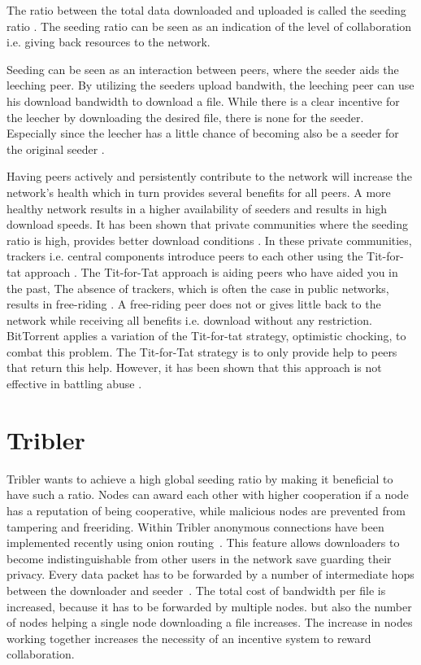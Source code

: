 The ratio between the total data downloaded and uploaded is called the seeding ratio \cite{Cohen-bittorrent}.
The seeding ratio can be seen as an indication of the level of collaboration i.e. giving back resources to the network.

Seeding can be seen as an interaction between peers, where the seeder aids the leeching peer.
By utilizing the seeders upload bandwith, the leeching peer can use his download bandwidth to download a file.
While there is a clear incentive for the leecher by downloading the desired file, there is none for the seeder.
Especially since the leecher has a little chance of becoming also be a seeder for the original seeder \cite{Lai-Incentives}.

Having peers actively and persistently contribute to the network will increase the network's health which in turn provides several benefits for all peers.
A more healthy network results in a higher availability of seeders and results in high download speeds.
It has been shown that private communities where the seeding ratio is high, provides better download conditions \cite{meulpolder-privatecommunities}.
In these private communities, trackers i.e. central components introduce peers to each other using the Tit-for-tat approach \cite{cohen-titfortat}.
The Tit-for-Tat approach is aiding peers who have aided you in the past,
The absence of trackers, which is often the case in public networks, results in free-riding \cite{Adar-Freeriding}.
A free-riding peer does not or gives little back to the network while receiving all benefits i.e. download without any restriction.
BitTorrent applies a variation of the Tit-for-tat strategy, optimistic chocking, to combat this problem.
The Tit-for-Tat strategy is to only provide help to peers that return this help.
However, it has been shown that this approach is not effective in battling abuse \cite{Pouwelse-tribler}.

\section{Tribler}
Tribler wants to achieve a high global seeding ratio by making it beneficial to have such a ratio.
Nodes can award each other with higher cooperation if a node has a reputation of being cooperative,
while malicious nodes are prevented from tampering and freeriding.
Within Tribler anonymous connections have been implemented recently using onion routing~\cite{Plak-anonymous,ruigrok-anonymous,tanaskoski-anonymous}.
This feature allows downloaders to become indistinguishable from other users in the network save guarding their privacy.
Every data packet has to be forwarded
by a number of intermediate hops between the downloader and seeder~\cite{Plak-anonymous,tanaskoski-anonymous}.
The total cost of bandwidth per file is increased,
because it has to be forwarded by multiple nodes.
but also the number of nodes helping a single node downloading a file increases.
The increase in nodes working together increases the necessity of an incentive system to reward collaboration.

